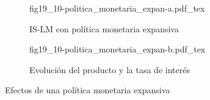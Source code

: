 \begin{figure}[h]
\captionsetup[subfigure]{aboveskip=20pt,belowskip=15pt}
\centering
\begin{subfigure}{.45\textwidth}
  \centering
        \def\svgwidth{\textwidth}
        {fig19_10-politica_monetaria_expan-a.pdf_tex}
  \caption{IS-LM con política monetaria expansiva}
  \label{fig19_10-politica_monetaria_expan-a}
\end{subfigure}\hspace{.05\textwidth}
\begin{subfigure}{.45\textwidth}
  \centering
        \def\svgwidth{\textwidth}
        {fig19_10-politica_monetaria_expan-b.pdf_tex}
  \caption{Evolución del producto y la tasa de interés}
  \label{fig19_10-politica_monetaria_expan-b}
\end{subfigure}
\caption{Efectos de una política monetaria expansiva}
\label{fig19_10-politica_monetaria_expan}
\end{figure}